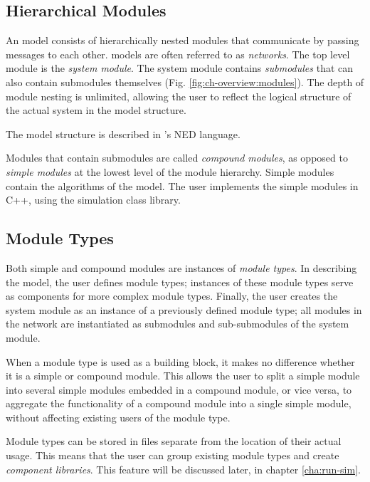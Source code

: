 \subsection{Hierarchical Modules}
\label{sec:overview:hierarchical-modules}


An {\opp} model consists of hierarchically nested
modules that communicate by passing
messages to each other.
{\opp} models are often referred to as \textit{networks}. The top
level module is the \textit{system module}.  The system module
contains \textit{submodules} that can also contain submodules
themselves (Fig. \ref{fig:ch-overview:modules}). The depth of module
nesting is unlimited, allowing the user to reflect the logical
structure of the actual system in the model structure.

The model structure is described in {\opp}'s NED language.

Modules that contain submodules are called \textit{compound
  modules}, as opposed to \textit{simple
  modules} at the lowest level of the
module hierarchy. Simple modules contain the algorithms of the model.
The user implements the simple modules in C++, using the {\opp}
simulation class library.


\subsection{Module Types}
\label{sec:overview:module-types}

Both simple and compound modules are instances of \textit{module
  types}. In describing the model, the user defines module types;
instances of these module types serve as components for more complex
module types. Finally, the user creates the system module as an
instance of a previously defined module type; all modules in the
network are instantiated as submodules and sub-submodules of the
system module.

When a module type is used as a building block, it makes no difference
whether it is a simple or compound module. This allows
the user to split a simple module into several
simple modules embedded in a compound module,
or vice versa, to aggregate the functionality of a compound module into a
single simple module, without affecting existing users of the module
type.

Module types can be stored in files separate from the location
of their actual usage. This means that the user can group existing
module types and create \textit{component libraries}.
This feature will be discussed later, in chapter \ref{cha:run-sim}.



